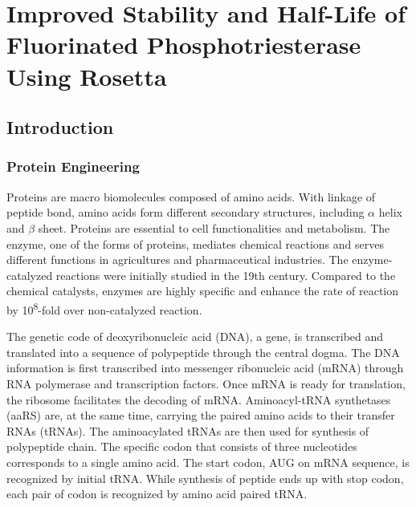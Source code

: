 \chapter{Improved Stability and Half-Life of Fluorinated Phosphotriesterase
Using Rosetta} 
\label{chap:rosetta}

\begin{refsection}

\section{Introduction}

\subsection{Protein Engineering}
\label{sec:protein-engineering}

Proteins are macro biomolecules composed of amino acids. With linkage of
peptide bond, amino acids form different secondary structures, including
$\alpha$ helix and $\beta$ sheet. Proteins are essential to cell
functionalities and metabolism. The enzyme, one of the forms of proteins,
mediates chemical reactions and serves different functions in agricultures and
pharmaceutical industries. The enzyme-catalyzed reactions were initially
studied in the 19th century\cite{AthelCornish-Bowden2012}. Compared to the
chemical catalysts, enzymes are highly specific and enhance the rate of
reaction by 10\textsuperscript{8}-fold over non-catalyzed
reaction\cite{Stryer1995}.

The genetic code of deoxyribonucleic acid (DNA), a gene, is transcribed and
translated into a sequence of polypeptide through the central
dogma\cite{CRICK1970}. The DNA information is first transcribed into messenger
ribonucleic acid (mRNA) through RNA polymerase and transcription factors. Once
mRNA is ready for translation, the ribosome facilitates the decoding of mRNA.
Aminoacyl-tRNA synthetases (aaRS) are, at the same time, carrying the paired
amino acids to their transfer RNAs (tRNAs). The aminoacylated tRNAs are then
used for synthesis of polypeptide chain. The specific codon that consists of
three nucleotides corresponds to a single amino acid. The start codon, AUG on
mRNA sequence, is recognized by initial tRNA. While synthesis of peptide ends
up with stop codon, each pair of codon is recognized by amino acid paired
tRNA\cite{Sadava2006}.


\end{refsection}
